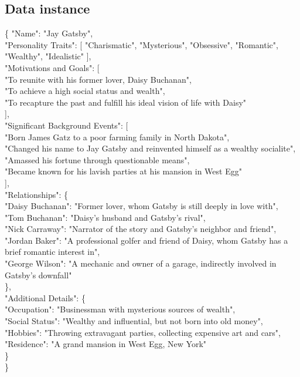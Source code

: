 \subsection{Data instance}
\label{sec:app_instance}
\begin{tcolorbox}[title = {Profile}, breakable]
\{
  "Name": "Jay Gatsby",\\
  "Personality Traits": [
    "Charismatic",
    "Mysterious",
    "Obsessive",
    "Romantic",
    "Wealthy",
    "Idealistic"
  ],\\
  "Motivations and Goals": [\\
    "To reunite with his former lover, Daisy Buchanan",\\
    "To achieve a high social status and wealth",\\
    "To recapture the past and fulfill his ideal vision of life with Daisy"\\
  ],\\
  "Significant Background Events": [\\
    "Born James Gatz to a poor farming family in North Dakota",\\
    "Changed his name to Jay Gatsby and reinvented himself as a wealthy socialite",\\
    "Amassed his fortune through questionable means",\\
    "Became known for his lavish parties at his mansion in West Egg"\\
  ],\\
  "Relationships": \{\\
    "Daisy Buchanan": "Former lover, whom Gatsby is still deeply in love with",\\
    "Tom Buchanan": "Daisy's husband and Gatsby's rival",\\
    "Nick Carraway": "Narrator of the story and Gatsby's neighbor and friend",\\
    "Jordan Baker": "A professional golfer and friend of Daisy, whom Gatsby has a brief romantic interest in",\\
    "George Wilson": "A mechanic and owner of a garage, indirectly involved in Gatsby's downfall"\\
  \},\\
  "Additional Details": \{\\
    "Occupation": "Businessman with mysterious sources of wealth",\\
    "Social Status": "Wealthy and influential, but not born into old money",\\
    "Hobbies": "Throwing extravagant parties, collecting expensive art and cars",\\
    "Residence": "A grand mansion in West Egg, New York"\\
  \}\\
\}\\
\end{tcolorbox}


